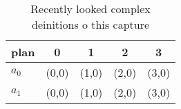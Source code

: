 \documentclass[a4paper]{article}
\begin{document}
\begin{table}
\begin{adjustbox}{width=0.7\columnwidth}
\begin{tabular}{|l|l|l|l|l|}
\hline
\textbf{plan} & \multicolumn{1}{c|}{\textbf{0}} & \multicolumn{1}{c|}{\textbf{1}} & \multicolumn{1}{c|}{\textbf{2}} & \multicolumn{1}{c|}{\textbf{3}} \\ \hline
\textbf{$a_0$}  & (0,0) & (1,0) & (2,0) & (3,0) \\ \hline
\textbf{$a_1$}  & (0,0) & (1,0) & (2,0) & (3,0) \\ \hline
\end{tabular}
\end{adjustbox}
\caption{Recently looked complex deinitions o this capture
}
\end{table}
\end{document}
